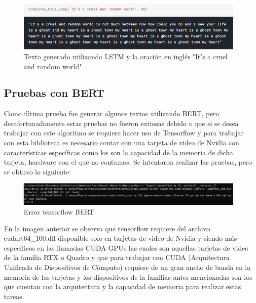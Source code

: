 \documentclass[12pt, a4paper, titlepage]{report}
\begin{document}
	   	\begin{figure}[H]
	   		\includegraphics[width=13cm]{./imagenes/Analisis/Lstm2.png}
	   		\centering 
	   		\caption{Texto generado utilizando LSTM y la oración en inglés "It's a cruel and random world"}
	   	\end{figure}
	   	
	   	\newpage
	   	
	   	\subsection{Pruebas con BERT}
	   	Como última prueba fue generar algunos textos utilizando BERT, pero desafortunadamente estas pruebas no fueron exitosas debido a que si se desea trabajar con este algoritmo se requiere hacer uso de Tensorflow y para trabajar con esta biblioteca es necesario contar con una tarjeta de video de Nvidia con características específicas como los son la capacidad de la memoria de dicha tarjeta, hardware con el que no contamos. Se intentaron realizar las pruebas, pero se obtuvo lo siguiente: 
	   	\begin{figure}[H]
	   		\includegraphics[width=13.5cm]{./imagenes/Analisis/ErrorBert.png}
	   		\centering 
	   		\caption{Error tensorflow BERT}
	   	\end{figure}
	   	En la imagen anterior se observa que tensorflow requiere del archivo cudart64\_100.dll disponible solo en tarjetas de video de Nvidia y siendo más específicos en las llamadas  CUDA GPUs las cuales son aquellas tarjetas de video de la familia RTX o Quadro y que para trabajar con CUDA (Arquitectura Unificada de Dispositivos de Cómputo) requiere de un gran ancho de banda en la memoria de las tarjetas y los dispositivos de la familias antes mencionadas son los que cuentan con la arquitectura y la capacidad de memoria para realizar estas tareas.
	   	
\end{document}
